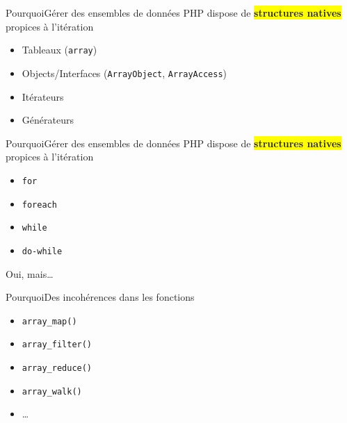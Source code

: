 \begin{frame}{Pourquoi}{Gérer des ensembles de données}
    PHP dispose de \colorbox{yellow}{\textbf{structures natives}} propices à l'itération

    \pause

    \begin{itemize}[<+->]
        \item Tableaux (\texttt{array})
        \item Objects/Interfaces (\texttt{ArrayObject}, \texttt{ArrayAccess})
        \item Itérateurs
        \item Générateurs
    \end{itemize}
\end{frame}

\begin{frame}{Pourquoi}{Gérer des ensembles de données}
    PHP dispose de \colorbox{yellow}{\textbf{structures natives}} propices à l'itération

    \pause

    \begin{itemize}[<+->]
        \item \texttt{for}
        \item \texttt{foreach}
        \item \texttt{while}
        \item \texttt{do-while}
    \end{itemize}
\end{frame}

\begin{frameC}{Oui, mais\ldots}

\end{frameC}

\begin{frame}{Pourquoi}{Des incohérences dans les fonctions}
    \begin{itemize}
        \item \texttt{array\_map()}
        \item \texttt{array\_filter()}
        \item \texttt{array\_reduce()}
        \item \texttt{array\_walk()}
        \item \ldots
    \end{itemize}
\end{frame}

